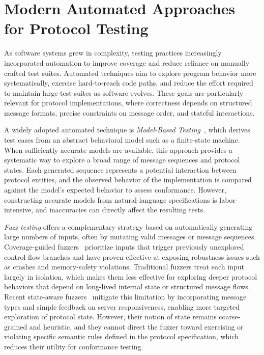 \section{Modern Automated Approaches for Protocol Testing}
As software systems grew in complexity, testing practices increasingly incorporated automation to improve coverage and reduce reliance on manually crafted test suites.
Automated techniques aim to explore program behavior more systematically, exercise hard-to-reach code paths, and reduce the effort required to maintain large test suites as software evolves.
These goals are particularly relevant for protocol implementations, where correctness depends on structured message formats, precise constraints on message order, and stateful interactions.

A widely adopted automated technique is \emph{Model-Based Testing}~\cite{MBT-reactive@2005, Utting:mbt@2006}, which derives test cases from an abstract behavioral model such as a finite-state machine.
When sufficiently accurate models are available, this approach provides a systematic way to explore a broad range of message sequences and protocol states.
Each generated sequence represents a potential interaction between protocol entities, and the observed behavior of the implementation is compared against the model's expected behavior to assess conformance.
However, constructing accurate models from natural-language specifications is labor-intensive, and inaccuracies can directly affect the resulting tests. 

\emph{Fuzz testing} offers a complementary strategy based on automatically generating large numbers of inputs, often by mutating valid messages or message sequences. 
Coverage-guided fuzzers~\cite{AFL, AFLplusplus-Woot20} prioritize inputs that trigger previously unexplored control-flow branches and have proven effective at exposing robustness issues such as crashes and memory-safety violations. 
Traditional fuzzers treat each input largely in isolation, which makes them less effective for exploring deeper protocol behaviors that depend on long-lived internal state or structured message flows. 
Recent state-aware fuzzers~\cite{AFLNET@ICST-20, SnapFuzz@ISSTA-22} mitigate this limitation by incorporating message types and simple feedback on server responsiveness, enabling more targeted exploration of protocol state. 
However, their notion of state remains coarse-grained and heuristic, and they cannot direct the fuzzer toward exercising or violating specific semantic rules defined in the protocol specification, which reduces their utility for conformance testing.

